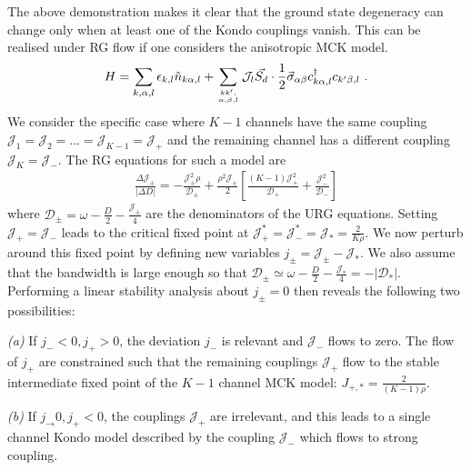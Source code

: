 \documentclass[reprint,prb,superscriptaddress]{revtex4-1}
\begin{document}
The above demonstration makes it clear that the ground state degeneracy can change only when at least one of the Kondo couplings vanish. This can be realised under RG flow if one considers the anisotropic MCK model.
\begin{align}
	H = \sum_{k,\alpha,l}\epsilon_{k,l} \hat n_{k\alpha,l} + \sum_{kk^\prime,\atop{\alpha,\beta,l}}{\mathcal{J}}_l \vec{S_d}\cdot\frac{1}{2}\vec{\sigma}_{\alpha\beta}c_{k\alpha,l}^\dagger c_{k^\prime\beta, l}~.
\end{align}
We consider the specific case where \(K-1\) channels have the same coupling \({\mathcal{J}}_1 = {\mathcal{J}}_2 = ... = {\mathcal{J}}_{K-1} = {\mathcal{J}}_+\) and the remaining channel has a different coupling \({\mathcal{J}}_K = {\mathcal{J}}_-\). The RG equations for such a model are
\begin{align}
	\frac{\Delta {\mathcal{J}}_\pm}{|\Delta D|} = -\frac{{\mathcal{J}}_\pm^2 \rho}{\mathcal{D}_\pm} + \frac{\rho^2 {\mathcal{J}}_\pm}{2}\left[\frac{(K-1){\mathcal{J}}_+^2}{\mathcal{D}_+} + \frac{{\mathcal{J}}_-^2}{\mathcal{D}_-}\right]
\end{align}
where \(\mathcal{D}_\pm = \omega - \frac{D}{2} - \frac{{\mathcal{J}}_\pm}{4}\) are the denominators of the URG equations.
Setting \({\mathcal{J}}_+ = {\mathcal{J}}_-\) leads to the critical fixed point at \({\mathcal{J}}_+^* = {\mathcal{J}}_-^* = {\mathcal{J}}_* = \frac{2}{K \rho}\). We now perturb around this fixed point by defining new variables \(j_\pm = {\mathcal{J}}_\pm - {\mathcal{J}}_*\). We also assume that the bandwidth is large enough so that \(\mathcal{D}_\pm \simeq \omega - \frac{D}{2} - \frac{{\mathcal{J}}_*}{4} = -|\mathcal{D}_*|\). Performing a linear stability analysis about \(j_\pm=0\) then reveals the following two possibilities:
\par\textit{(a)} If \(j_-<0,j_+>0\), the deviation \(j_-\) is relevant and \(\mathcal{J}_-\) flows to zero. The flow of \(j_+\) are constrained such that the remaining couplings \(\mathcal{J}_+\) flow to the stable intermediate fixed point of the \(K-1\) channel MCK model: \(J_{+,*} = \frac{2}{(K-1)\rho}\).
\par\textit{(b)} If \(j_\to 0, j_+<0\), the couplings \(\mathcal{J}_+\) are irrelevant, and this leads to a single channel Kondo model described by the coupling \(\mathcal{J}_-\) which flows to strong coupling.
\end{document}
